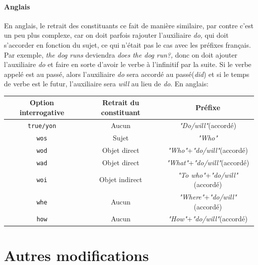 \documentclass[11pt]{article} %
\newcommand{\real}[1]{\emph{#1}}
\begin{document}
\paragraph{Anglais}

En anglais, le retrait des constituants ce fait de manière similaire,
par contre c'est un peu plus complexe, car on doit parfois rajouter
l'auxiliaire \emph{do, }qui doit s'accorder en fonction du sujet,
ce qui n'était pas le cas avec les préfixes français.\emph{ }Par exemple,
\emph{the dog runs} deviendra \emph{does the dog run?, }donc on doit
ajouter l'auxiliaire \emph{do }et faire en sorte d'avoir le verbe
à l'infinitif par la suite. Si le verbe appelé est au passé, alors
l'auxiliaire \emph{do }sera accordé au passé(\emph{did}) et si le
temps de verbe est le futur, l'auxiliaire sera \emph{will }au lieu
de \emph{do}. En anglais:

\begin{tabular}{|c|c|c|}
\hline 
Option interrogative & Retrait du constituant & Préfixe\tabularnewline
\hline 
\hline 
\texttt{true/yon} & Aucun & \real{"Do/will"}(accordé)\\
\hline 
\texttt{wos} & Sujet & \real{"Who"}\\
\hline 
\texttt{wod} & Objet direct & \real{"Who"}+\real{"do/will"}(accordé)\\
\hline 
\texttt{wad} & Objet direct & \real{"What"}+\real{"do/will"}(accordé)\\
\hline 
\texttt{woi} & Objet indirect & \real{"To who"}+\real{"do/will"}(accordé)\\
\hline 
\texttt{whe} & Aucun & \real{"Where"}+\real{"do/will"}(accordé)\\
\hline 
\texttt{how} & Aucun & \real{"How"}+\real{"do/will"}(accordé)\\
\hline 
\end{tabular}

\section{Autres modifications}
\end{document}
